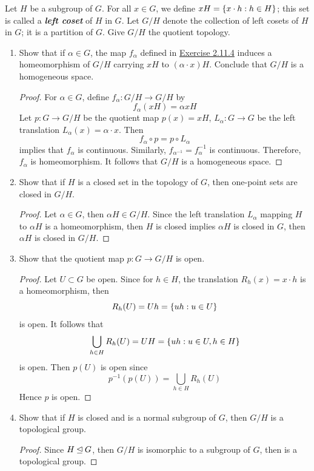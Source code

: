 \documentclass[12pt,a4paper]{article}
\begin{document}
    \begin{ex}\label{2.11.5}
        Let $H$ be a subgroup of $G$. For all $x\in G$, we define $xH=\left\{x\cdot h: h\in H\right\}$; this set is called a \textbf{\textit{left coset}} of $H$ in $G$. Let $G/H$ denote the collection of left cosets of $H$ in $G$; it is a partition of $G$. Give $G/H$ the quotient topology.
        \begin{enumerate}
            \item Show that if $\alpha\in G$, the map $f_\alpha$ defined in \hyperref[2.11.4]{Exercise 2.11.4} induces a homeomorphism of $G/H$ carrying $xH$ to $(\alpha\cdot x)H$. Conclude that $G/H$ is a homogeneous space.
            \begin{proof}
                For $\alpha\in G$, define $f_\alpha:G/H\to G/H$ by
                $$
                f_\alpha(xH)=\alpha xH
                $$
                Let $p:G\to G/H$ be the quotient map $p(x)=xH$, $L_\alpha:G\to G$ be the left translation $L_\alpha(x)=\alpha\cdot x$. Then 
                $$
                f_\alpha\circ p=p\circ L_\alpha
                $$
                implies that $f_\alpha$ is continuous. Similarly, $f_{\alpha^{-1}}=f_{\alpha}^{-1}$ is continuous. Therefore, $f_\alpha$ is homeomorphism. It follows that $G/H$ is a homogeneous space.
            \end{proof}
            \item Show that if $H$ is a closed set in the topology of $G$, then one-point sets are closed in $G/H$.
            \begin{proof}
                Let $\alpha\in G$, then $\alpha H\in G/H$. Since the left translation $L_\alpha$ mapping $H$ to $\alpha H$ is a homeomorphism, then $H$ is closed implies $\alpha H$ is closed in $G$, then $\alpha H$ is closed in $G/H$. 
            \end{proof}
            \item Show that the quotient map $p:G\to G/H$ is open.
            \begin{proof}
                Let $U\subset G$ be open. Since for $h\in H$, the translation $R_h(x)=x\cdot h$ is a homeomorphism, then
                $$
                R_h(U)=Uh=\left\{uh:u\in U\right\}
                $$
                is open. It follows that
                $$
                \bigcup_{h\in H}R_h(U)=UH=\left\{uh:u\in U,h\in H\right\}
                $$
                is open. Then $p(U)$ is open since 
                $$
                p^{-1}(p(U))=\bigcup_{h\in H}R_h(U)
                $$
                Hence $p$ is open.
            \end{proof}
            \item Show that if $H$ is closed and is a normal subgroup of $G$, then $G/H$ is a topological group.
            \begin{proof}
                Since $H\unlhd G$, then $G/H$ is isomorphic to a subgroup of $G$, then is a topological group.
            \end{proof}
        \end{enumerate}
    \end{ex}
    \hfill
\end{document}
